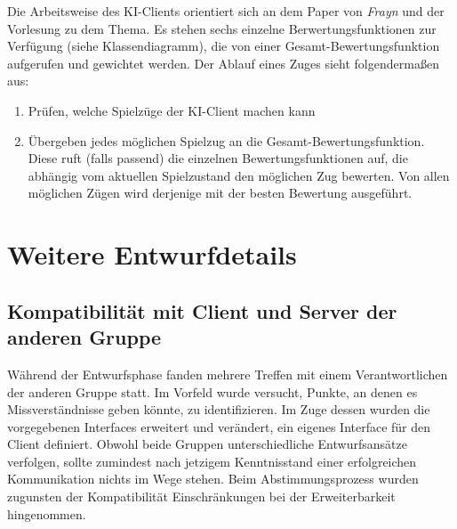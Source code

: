 \documentclass[a4paper,10pt]{article}
\begin{document}
Die Arbeitsweise des KI-Clients orientiert sich an dem Paper von \textit{Frayn} und der Vorlesung zu dem Thema. Es stehen sechs einzelne Berwertungsfunktionen zur Verfügung (siehe Klassendiagramm), die von einer Gesamt-Bewertungsfunktion aufgerufen und gewichtet werden. Der Ablauf eines Zuges sieht folgendermaßen aus:
\begin{enumerate}
\item Prüfen, welche Spielzüge der KI-Client machen kann
\item Übergeben jedes möglichen Spielzug an die Gesamt-Bewertungsfunktion. Diese ruft (falls passend) die einzelnen Bewertungsfunktionen auf, die abhängig vom aktuellen Spielzustand den möglichen Zug bewerten. Von allen möglichen Zügen wird derjenige mit der besten Bewertung ausgeführt.
\end{enumerate}
\section{Weitere Entwurfdetails}
\subsection{Kompatibilität mit Client und Server der anderen Gruppe}
Während der Entwurfsphase fanden mehrere Treffen mit einem Verantwortlichen der anderen Gruppe statt. Im Vorfeld wurde versucht, Punkte, an denen es Missverständnisse geben könnte, zu identifizieren. Im Zuge dessen wurden die vorgegebenen Interfaces erweitert und verändert, ein eigenes Interface für den Client definiert. Obwohl beide Gruppen unterschiedliche Entwurfsansätze verfolgen, sollte zumindest nach jetzigem Kenntnisstand einer erfolgreichen Kommunikation nichts im Wege stehen. Beim Abstimmungsprozess wurden zugunsten der Kompatibilität Einschränkungen bei der Erweiterbarkeit hingenommen.
\end{document}
